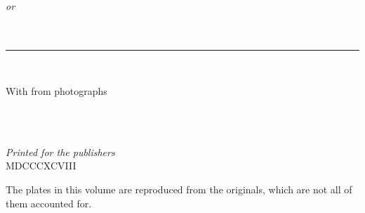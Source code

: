 \documentclass[11pt,twoside,openright]{book}
\begin{document}
\frontmatter
\pagestyle{empty}



\null\vspace*{0.35in}
\begin{center}
  {\Large{}}\\[1.5\baselineskip]
  {\footnotesize\itshape or}\\[0.9\baselineskip]
  {}\\[0.5\baselineskip]
  {}\\[2.4\baselineskip]

  \rule{0.20\textwidth}{0.4pt}\\[2.6\baselineskip]

  \begin{minipage}{0.84\textwidth}\centering\footnotesize
  With  from photographs
  \end{minipage}\\[3.4\baselineskip]
\end{center}
\vfill
\begin{center}
  {}\\[0.4\baselineskip]
  {\footnotesize\itshape Printed for the publishers}\\[0.4\baselineskip]
  {\footnotesize MDCCCXCVIII}
\end{center}
\vspace*{0.35in}

\clearpage
\thispagestyle{empty}
\null\vfill
\begin{center}\begin{minipage}{0.70\textwidth}\centering\footnotesize
The plates in this volume are reproduced from the originals, which are not
all of them accounted for.
\end{minipage}\end{center}
\vfill\null

\mainmatter

\end{document}
